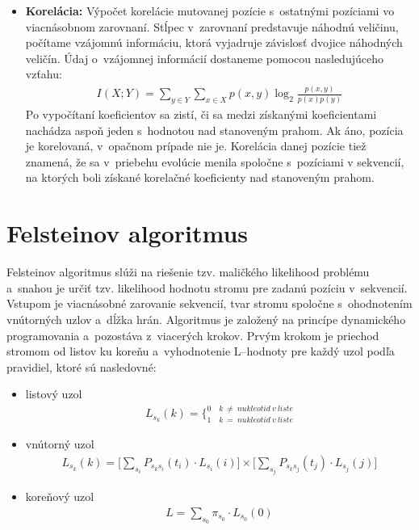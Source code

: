 \begin{itemize}
	\item \textbf{Korelácia:} Výpočet korelácie mutovanej pozície s~ostatnými pozíciami vo viacnásobnom zarovnaní. Stĺpec v~zarovnaní predstavuje náhodnú veličinu, počítame vzájomnú informáciu, ktorá vyjadruje závislosť dvojice náhodných veličín. Údaj o~vzájomnej informácií dostaneme pomocou nasledujúceho vzťahu: 	
	\begin{align}
	I(X;Y) = \underset{y \in Y}{\sum} \underset{x \in X}{\sum} p(x,y) \log_{2}\frac{p(x,y)}{p(x) p(y)}
	\end{align}  
	Po vypočítaní koeficientov sa zistí, či sa medzi získanými koeficientami nachádza aspoň jeden s~hodnotou nad stanoveným prahom. Ak áno, pozícia je korelovaná, v~opačnom prípade nie je. Korelácia danej pozície tiež znamená, že sa v~priebehu evolúcie menila spoločne s~pozíciami v sekvencií, na ktorých boli získané korelačné koeficienty nad stanoveným prahom. 
	
\end{itemize}

\section{Felsteinov algoritmus}
\label{felstein}
Felsteinov algoritmus slúži na riešenie tzv. maličkého likelihood problému a~snahou je určiť tzv. likelihood hodnotu stromu pre zadanú pozíciu v~sekvencií. Vstupom je viacnásobné zarovanie sekvencií, tvar stromu spoločne s~ohodnotením vnútorných uzlov a~dĺžka hrán. 
Algoritmus je založený na princípe dynamického programovania a~pozostáva z~viacerých krokov.
Prvým krokom je priechod stromom od listov ku koreňu a~vyhodnotenie L--hodnoty pre každý uzol podľa pravidiel, ktoré sú nasledovné:
\begin{itemize}
	\item listový uzol
	\begin{align}
	L_{s_{k}} (k) = \bigg\{_{1\quad k\ =\ nukleotid\ v\  liste}^{0\quad k\ \neq\ nukleotid\ v\  liste}
	\end{align}  
	
	\item vnútorný uzol
	\begin{align}
	L_{s_{k}} (k) = \Bigg[\underset{s_{i}}{\sum}P_{s_{k}s_{i}}(t_{i})\cdotp L_{s_{i}}(i)\Bigg] \times \Bigg[\underset{s_{j}}{\sum}P_{s_{k}s_{j}}(t_{j})\cdotp L_{s_{j}}(j)\Bigg]
	\end{align}
	
	\item koreňový uzol
	\begin{align}
	L = \underset{s_{0}}{\sum}\pi_{s_{0}} \cdotp L_{s_{0}}(0)
	\end{align} 

\end{itemize}

